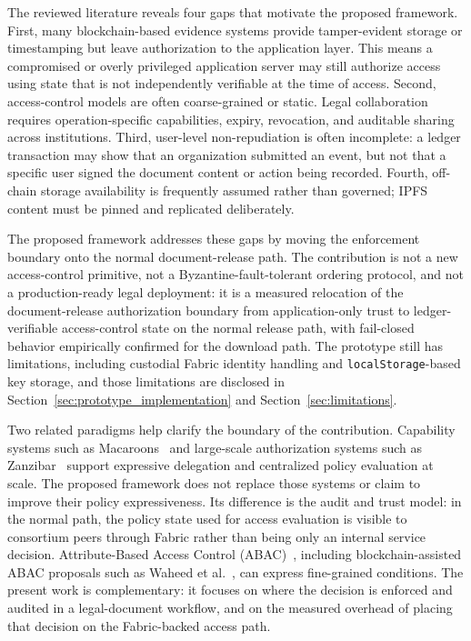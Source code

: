 \documentclass{ieeeaccess}
\begin{document}
The reviewed literature reveals four gaps that motivate the proposed
framework. First, many blockchain-based evidence systems provide
tamper-evident storage or timestamping but leave authorization to the
application layer. This means a compromised or overly privileged
application server may still authorize access using state that is not
independently verifiable at the time of access. Second, access-control
models are often coarse-grained or static. Legal collaboration
requires operation-specific capabilities, expiry, revocation, and
auditable sharing across institutions. Third, user-level
non-repudiation is often incomplete: a ledger transaction may show
that an organization submitted an event, but not that a specific user
signed the document content or action being recorded. Fourth,
off-chain storage availability is frequently assumed rather than
governed; IPFS content must be pinned and replicated deliberately.

The proposed framework addresses these gaps by moving the enforcement boundary onto the normal document-release path.
The contribution is not a new access-control primitive, not a
Byzantine-fault-tolerant ordering protocol, and not a
production-ready legal deployment: it is a measured relocation of
the document-release authorization boundary from application-only
trust to ledger-verifiable access-control state on the
normal release path, with fail-closed behavior empirically
confirmed for the download path. The prototype still has limitations, including custodial Fabric
identity handling and \texttt{localStorage}-based key storage, and
those limitations are disclosed in
Section~\ref{sec:prototype_implementation} and
Section~\ref{sec:limitations}.

Two related paradigms help clarify the boundary of the contribution.
Capability systems such as Macaroons~\cite{macaroons2014} and
large-scale authorization systems such as Zanzibar~\cite{zanzibar2019}
support expressive delegation and centralized policy evaluation at
scale. The proposed framework does not replace those systems or claim
to improve their policy expressiveness. Its difference is the audit
and trust model: in the normal path, the policy state used for access
evaluation is visible to consortium peers through Fabric rather than being
only an internal service decision. Attribute-Based Access Control
(ABAC)~\cite{hu2014guide}, including blockchain-assisted ABAC proposals such
as Waheed et al.~\cite{waheed2025dynamicabac}, can express fine-grained
conditions. The present work is complementary: it focuses on where the
decision is enforced and audited in a legal-document workflow, and on
the measured overhead of placing that decision on the Fabric-backed
access path.
\end{document}
